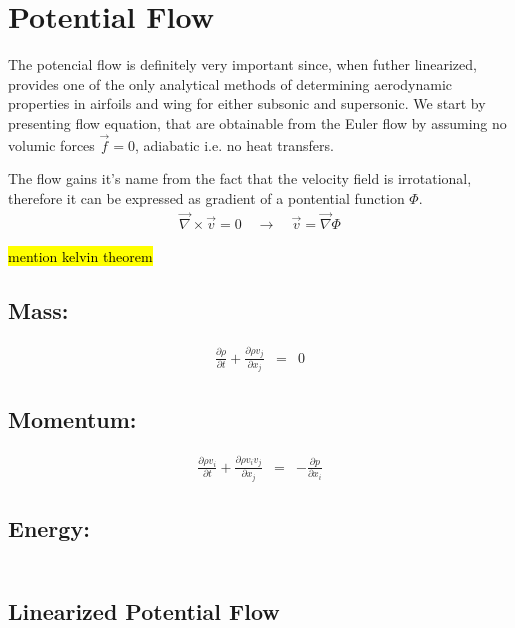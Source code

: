 \newpage
\section{Potential Flow}
The potencial flow is definitely very important since, when futher linearized, provides one of the only analytical methods of determining aerodynamic properties in airfoils and wing for either subsonic and supersonic.
We start by presenting flow equation, that are obtainable from the Euler flow by assuming no volumic forces $\vec{f}=0$, adiabatic i.e. no heat transfers. 

The flow gains it's name from the fact that the velocity field is irrotational, therefore it can be expressed as gradient of a pontential function $\Phi$.
\begin{eqnarray}        
    \vec{\nabla}\times \vec{v} = 0   \quad \rightarrow \quad  \vec{v}=\vec{\nabla} \Phi
\end{eqnarray}        

\hl{mention kelvin theorem}
\subsection*{Mass:}
\begin{eqnarray}        
    \frac{\partial \rho}{\partial t} +  \frac{\partial \rho v_j}{\partial x_j} &=& 0 
\end{eqnarray}        

\subsection*{Momentum:}
\begin{eqnarray}        
    \frac{\partial \rho v_i}{\partial t} +  \frac{\partial \rho v_i v_j}{\partial x_j} &=& - \frac{\partial p}{\partial x_i} 
\end{eqnarray}        

\subsection*{Energy:}
\begin{eqnarray}        
\end{eqnarray}        


\subsection{Linearized Potential Flow}









